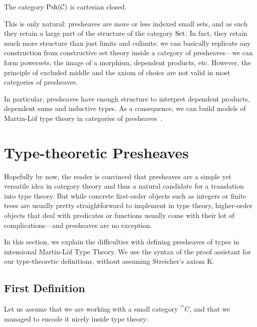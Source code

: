 \begin{theorem}
    The category \( \mathrm{Psh}(\mathcal{C}) \) is cartesian closed.
\end{theorem}

This is only natural: presheaves are more or less indexed small sets, and as 
such they retain a large part of the structure of the category \( \mathrm{Set} \). In fact, they
retain much more structure than just limits and colimits: we can basically 
% 
% 
replicate any construction from constructive set theory inside a category of 
presheaves---we can form powersets, the image of a morphism, dependent 
products, etc. However, the principle of excluded middle and the axiom of 
choice are not valid in most categories of presheaves.

In particular, presheaves have enough structure to interpret 
dependent products, dependent sums and inductive types. As a consequence, we
can build models of Martin-Löf type theory in categories of 
presheaves~.

\section{Type-theoretic Presheaves}
\label{sec:intensional-problems}

Hopefully by now, the reader is convinced that presheaves are a simple yet 
versatile idea in category theory and thus a natural candidate for a 
translation into type theory.
% 
But while concrete first-order objects such as integers or finite trees 
are usually pretty straightforward to implement in type theory, higher-order objects 
that deal with predicates or functions usually come with their lot of 
complications---and presheaves are no exception.

In this section, we explain the difficulties with defining presheaves of types
in intensional Martin-Löf Type Theory. 
% 
We use the syntax of the \Agda proof assistant for our type-theoretic
definitions, without assuming Streicher's axiom K.

\subsection{First Definition}

Let us assume that we are working with a small category \( \cat{C} \), and that we
managed to encode it nicely inside type theory:


